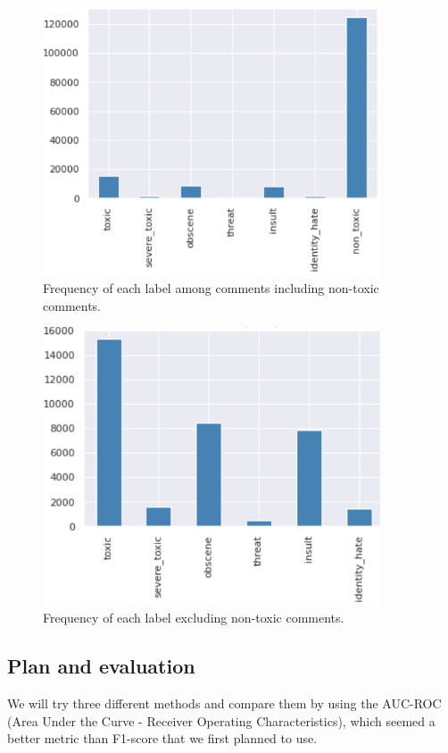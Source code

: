 \documentclass[11pt]{scrartcl}
\begin{document}
\begin{figure}[H]
    \centering
    \includegraphics[width=10cm]{img/all_labels_frequency.PNG}
    \caption{Frequency of each label among comments including non-toxic comments.}
    \label{fig:all-labels}
\end{figure}

\begin{figure}[H]
    \centering
    \includegraphics[width=10cm]{img/labels_frequency.PNG}
    \caption{Frequency of each label excluding non-toxic comments.}
    \label{fig:labels}
\end{figure}



\subsection{Plan and evaluation}

We will try three different methods and compare them by using the AUC-ROC (Area Under the Curve - Receiver Operating Characteristics), which seemed a better metric than F1-score that we first planned to use.
\end{document}
